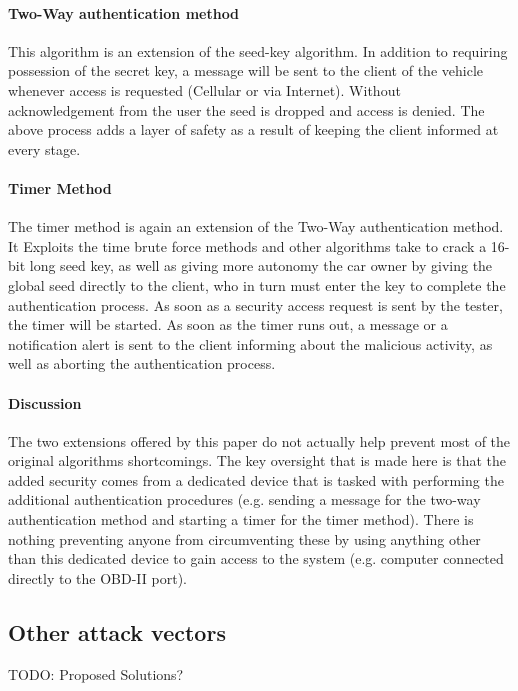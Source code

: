 \documentclass[11pt]{article}
\begin{document}
\paragraph{Two-Way authentication method}
This algorithm is an extension of the seed-key algorithm. In addition to requiring possession of the secret key, a message will be sent to the client of the vehicle whenever access is requested (Cellular or via Internet). Without acknowledgement from the user the seed is dropped and access is denied. The above process adds a layer of safety as a result of keeping the client informed at every stage.

\paragraph{Timer Method}  
The timer method is again an extension of the Two-Way authentication method. It Exploits the time brute force methods and other algorithms take to crack a 16-bit long seed key, as well as giving more autonomy the car owner by giving the global seed directly to the client, who in turn must enter the key to complete the authentication process. As soon as a security access request is sent by the tester, the timer will be started. As soon as the timer runs out, a message or a notification alert is sent to the client informing about the malicious activity, as well as aborting the authentication process. 

\paragraph{Discussion} 
The two extensions offered by this paper do not actually help prevent most of the original algorithms shortcomings. The key oversight that is made here is that the added security comes from a dedicated device that is tasked with performing the additional authentication procedures (e.g. sending a message for the two-way authentication method and starting a timer for the timer method). There is nothing preventing anyone from circumventing these by using anything other than this dedicated device to gain access to the system (e.g. computer connected directly to the OBD-II port). 

\subsection{Other attack vectors}
\label{sec:other_attack_vectors}

TODO: Proposed Solutions?
\end{document}

